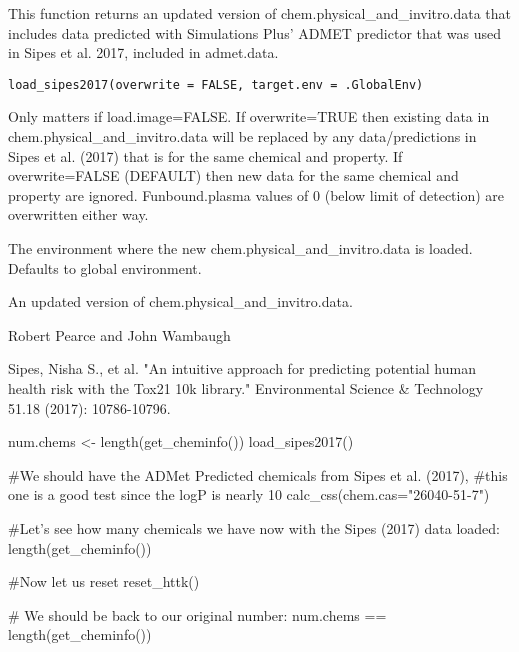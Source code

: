 \documentclass[a4paper]{book}
\begin{document}
%
\begin{Description}\relax
This function returns an updated version of chem.physical\_and\_invitro.data
that includes data predicted with Simulations Plus' ADMET predictor that was
used in Sipes et al. 2017, included in admet.data.
\end{Description}
%
\begin{Usage}
\begin{verbatim}
load_sipes2017(overwrite = FALSE, target.env = .GlobalEnv)
\end{verbatim}
\end{Usage}
%
\begin{Arguments}
\begin{ldescription}
\item[\code{overwrite}] Only matters if load.image=FALSE. If overwrite=TRUE then
existing data in chem.physical\_and\_invitro.data will be replaced by any
data/predictions in Sipes et al. (2017) that is for the same chemical and
property. If overwrite=FALSE (DEFAULT) then new data for the same chemical
and property are ignored.  Funbound.plasma values of 0 (below limit of
detection) are overwritten either way.

\item[\code{target.env}] The environment where the new
chem.physical\_and\_invitro.data is loaded. Defaults to global environment.
\end{ldescription}
\end{Arguments}
%
\begin{Value}
\begin{ldescription}
\item[\code{data.frame}] An updated version of
chem.physical\_and\_invitro.data.
\end{ldescription}
\end{Value}
%
\begin{Author}\relax
Robert Pearce and John Wambaugh
\end{Author}
%
\begin{References}\relax
Sipes, Nisha S., et al. "An intuitive approach for predicting
potential human health risk with the Tox21 10k library." Environmental
Science \& Technology 51.18 (2017): 10786-10796.
\end{References}
%
\begin{Examples}
\begin{ExampleCode}


num.chems <- length(get_cheminfo())
load_sipes2017()

#We should have the ADMet Predicted chemicals from Sipes et al. (2017),
#this one is a good test since the logP is nearly 10
calc_css(chem.cas="26040-51-7")

#Let's see how many chemicals we have now with the Sipes (2017) data loaded:
length(get_cheminfo())

#Now let us reset
reset_httk()

# We should be back to our original number:
num.chems == length(get_cheminfo())
                        

\end{ExampleCode}
\end{Examples}
\end{document}
